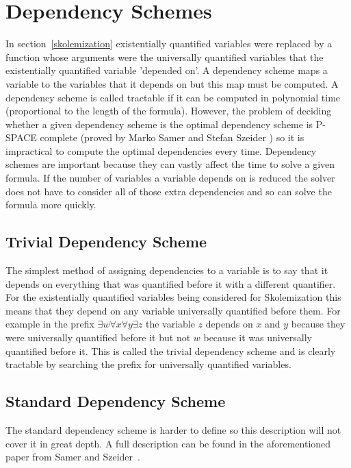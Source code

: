 \section{Dependency Schemes} \label{dependencyschemes}
In section~\ref{skolemization} existentially quantified variables were replaced by a function whose arguments were the universally quantified variables that the existentially quantified variable 'depended on'. A dependency scheme maps a variable to the variables that it depends on but this map must be computed. A dependency scheme is called tractable if it can be computed in polynomial time (proportional to the length of the formula). However, the problem of deciding whether a given dependency scheme is the optimal dependency scheme is P-SPACE complete (proved by Marko Samer and Stefan Szeider \cite{backdoorsets}) so it is impractical to compute the optimal dependencies every time.
Dependency schemes are important because they can vastly affect the time to solve a given formula. If the number of variables a variable depends on is reduced the solver does not have to consider all of those extra dependencies and so can solve the formula more quickly.

\subsection{Trivial Dependency Scheme}
The simplest method of assigning dependencies to a variable is to say that it depends on everything that was quantified before it with a different quantifier. For the existentially quantified variables being considered for Skolemization this means that they depend on any variable universally quantified before them. For example in the prefix $\exists w \forall x \forall y \exists z$ the variable $z$ depends on $x$ and $y$ because they were universally quantified before it but not $w$ because it was universally quantified before it. This is called the trivial dependency scheme and is clearly tractable by searching the prefix for universally quantified variables.

\subsection{Standard Dependency Scheme}
The standard dependency scheme is harder to define so this description will not cover it in great depth. A full description can be found in the aforementioned paper from Samer and Szeider~\cite{backdoorsets}.

